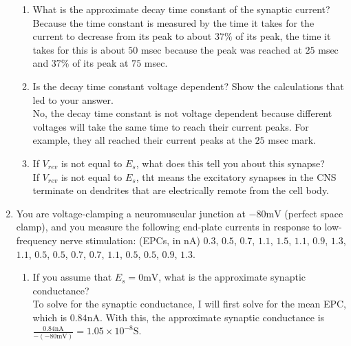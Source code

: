 \documentclass[11pt]{article}
\begin{document}
\begin{enumerate}[label=\arabic*.]
\begin{enumerate}[label=(\alph*)]
\item
What is the approximate decay time constant of the synaptic current?
\vspace*{1\baselineskip}
\\
Because the time constant is measured by the time it takes for the current to decrease from its peak to about $37\%$ of its peak, the time it takes for this is about $50$ msec because the peak was reached at $25$ msec and $37\%$ of its peak at $75$ msec.



\item
Is the decay time constant voltage dependent? Show the calculations that led to your answer.
\vspace*{1\baselineskip}
\\
No, the decay time constant is not voltage dependent because different voltages will take the same time to reach their current peaks. For example, they all reached their current peaks at the $25$ msec mark.



\item
If $V_{rev}$ is not equal to $E_s$, what does this tell you about this synapse?
\vspace*{1\baselineskip}
\\
If $V_{rev}$ is not equal to $E_s$, tht means the excitatory synapses in the CNS terminate on dendrites that are electrically remote from the cell body.
\end{enumerate}



\newpage
\item
You are voltage-clamping a neuromuscular junction at $-80 \text{mV}$ (perfect space clamp), and you measure the following end-plate currents in response to low-frequency nerve stimulation: (EPCs, in nA) $0.3$, $0.5$, $0.7$, $1.1$, $1.5$, $1.1$, $0.9$, $1.3$, $1.1$, $0.5$, $0.5$, $0.7$, $0.7$, $1.1$, $0.5$, $0.5$, $0.9$, $1.3$.
\begin{enumerate}[label=(\alph*)]
\item
If you assume that $E_s = 0 \text{mV}$, what is the approximate synaptic conductance?
\vspace*{1\baselineskip}
\\
To solve for the synaptic conductance, I will first solve for the mean EPC, which is $0.84 \text{nA}$.
With this, the approximate synaptic conductance is $\frac{0.84 \text{nA}} {-(-80 \text{mV})} = 1.05 \times 10 ^{-8} \text{S}$.




\end{enumerate}
\end{enumerate}
\end{document}
